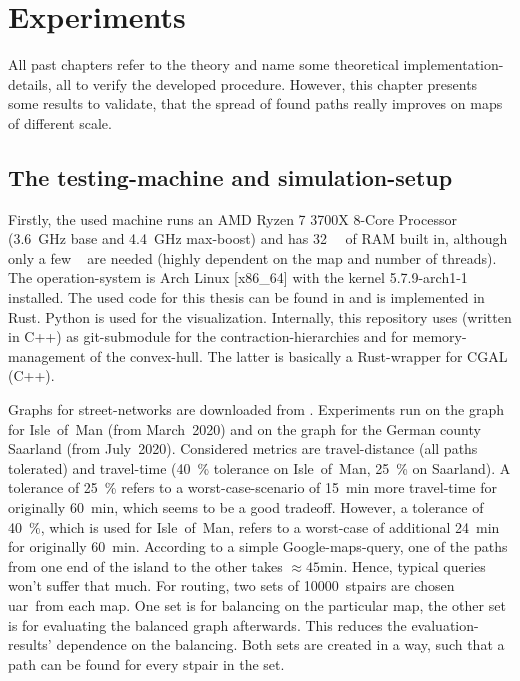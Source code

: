 \chapter{Experiments}
\label{chap:experiments}

All past chapters refer to the theory and name some theoretical implementation-details, all to verify the developed procedure.
However, this chapter presents some results to validate, that the spread of found paths really improves on maps of different scale.

\section{The testing-machine and simulation-setup}

    Firstly, the used machine runs an AMD Ryzen 7 3700X 8-Core Processor (\si{\num{3.6} \giga\hertz} base and \si{\num{4.4} \giga\hertz} max-boost) and has \si{\num{32} \giga\byte} of RAM built in, although only a few \si{\giga\byte} are needed (highly dependent on the map and number of threads).
    The operation-system is Arch Linux [x86\_64] with the kernel 5.7.9-arch1-1 installed.
    The used code for this thesis can be found in \cite{github:dominicparga/osmgraphing} and is implemented in Rust.
    Python is used for the visualization.
    Internally, this repository uses \cite{github:lesstat/multi-ch-constructor} (written in C++) as git-submodule for the \gls{contraction-hierarchies} and \cite{github:lesstat/nd-triangulation} for memory-management of the convex-hull.
    The latter is basically a Rust-wrapper for CGAL (C++).

    Graphs for street-networks are downloaded from \cite{osm}.
    Experiments run on the graph for Isle~of~Man (from March~2020) and on the graph for the German county Saarland (from July~2020).
    Considered \glspl{metric} are travel-distance (all paths tolerated) and travel-time (\si{40 \percent} tolerance on Isle~of~Man, \si{25 \percent} on Saarland).
    A tolerance of \si{25 \percent} refers to a worst-case-scenario of \si{15 \minute} more travel-time for originally \si{60 \minute}, which seems to be a good tradeoff.
    However, a tolerance of \si{40 \percent}, which is used for Isle~of~Man, refers to a worst-case of additional \si{24 \minute} for originally \si{60 \minute}.
    According to a simple Google-maps-query, one of the paths from one end of the island to the other takes $\approx \si{45 \minute}$.
    Hence, typical queries won't suffer that much.
    For routing, two sets of \num{10000}~\glspl{stpair} are chosen \gls{uar}\ from each map.
    One set is for \gls{balancing} on the particular map, the other set is for evaluating the balanced graph afterwards.
    This reduces the evaluation-results' dependence on the \gls{balancing}.
    Both sets are created in a way, such that a path can be found for every \gls{stpair} in the set.

